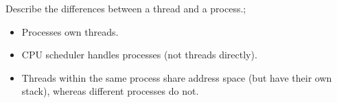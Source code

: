 \documentclass{article}
\begin{document}
Describe the differences between a thread and a process.; \begin{itemize} \item Processes own threads.  \item CPU scheduler handles processes (not threads directly).  \item Threads within the same process share address space (but have their own stack), whereas different processes do not.  \end{itemize} 
\end{document}
